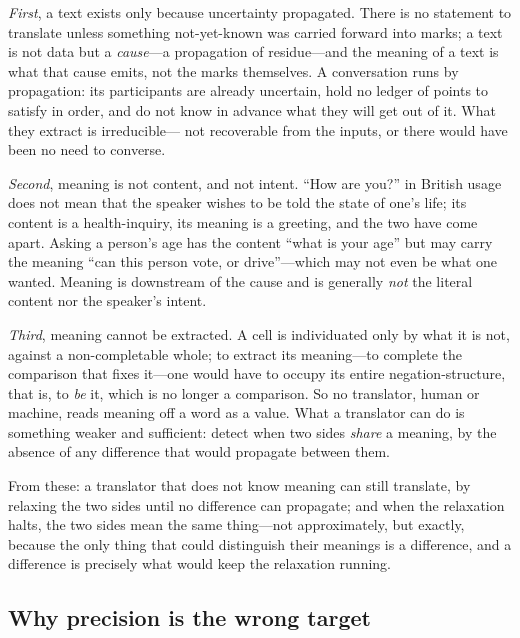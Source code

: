 \documentclass[11pt,a4paper]{article}
\theoremstyle{thmstyle}
\theoremstyle{definition}
\theoremstyle{remark}
\begin{document}
\emph{First}, a text exists only because uncertainty propagated. There is no
statement to translate unless something not-yet-known was carried forward
into marks; a text is not data but a \emph{cause}---a propagation of
residue---and the meaning of a text is what that cause emits, not the marks
themselves. A conversation runs by propagation: its participants are already
uncertain, hold no ledger of points to satisfy in order, and do not know
in advance what they will get out of it. What they extract is irreducible---
not recoverable from the inputs, or there would have been no need to
converse.

\emph{Second}, meaning is not content, and not intent. ``How are you?''
in British usage does not mean that the speaker wishes to be told the state
of one's life; its content is a health-inquiry, its meaning is a greeting,
and the two have come apart. Asking a person's age has the content
``what is your age'' but may carry the meaning ``can this person vote, or
drive''---which may not even be what one wanted. Meaning is downstream of the
cause and is generally \emph{not} the literal content nor the speaker's
intent.

\emph{Third}, meaning cannot be extracted. A cell is individuated only by
what it is not, against a non-completable whole; to extract its meaning---to
complete the comparison that fixes it---one would have to occupy its entire
negation-structure, that is, to \emph{be} it, which is no longer a
comparison. So no translator, human or machine, reads meaning off a word as
a value. What a translator can do is something weaker and sufficient: detect
when two sides \emph{share} a meaning, by the absence of any difference that
would propagate between them.

From these: a translator that does not know meaning can still translate, by
relaxing the two sides until no difference can propagate; and when the
relaxation halts, the two sides mean the same thing---not approximately, but
exactly, because the only thing that could distinguish their meanings is a
difference, and a difference is precisely what would keep the relaxation
running.

\subsection{Why precision is the wrong target}
\end{document}
